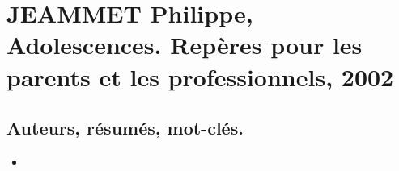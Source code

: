 \documentclass[12pt]{report}
\begin{document}
\tableofcontents

\part{JEAMMET Philippe, Adolescences. Repères pour les parents et les professionnels, 2002}

\chapter*{Auteurs, résumés, mot-clés.}

\begin{itemize}
\item 

























\end{itemize}
\end{document}
